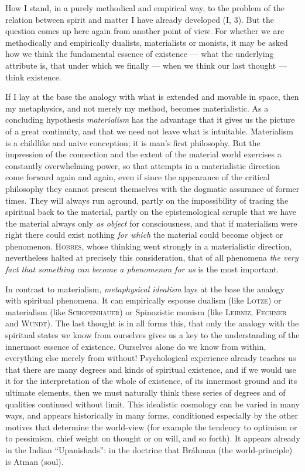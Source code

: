 \documentclass[12pt,a4paper]{book}
\newcommand{\opage}[1]{\marginnote{\footnotesize\textit{[#1]}}}
\begin{document}
How I stand, in a purely methodical and empirical way, to the problem of the
relation between spirit and matter I have already developed (I, 3). But the
question comes up here again from another point of view. For whether we are
methodically and empirically dualists, materialists or monists, it may be asked
how we think the fundamental essence of existence --- what the underlying
attribute is, that under which we finally --- when we think our last thought ---
think existence.

If I lay at the base the analogy with what is extended and movable in space, then
my metaphysics, and not merely my method, becomes materialistic. As a concluding
hypothesis \emph{materialism} has the advantage that it gives us the picture of a
great continuity, and that we need not leave what is intuitable. Materialism is a
childlike and naive conception; it is man's first philosophy. But the impression
of the connection and the extent of the material world exercises a constantly
overwhelming power, so that attempts in a materialistic direction come forward
again and again, even if since the appearance of the critical philosophy they
cannot present themselves with the dogmatic assurance of former times. They will
always run aground, partly on the impossibility of tracing the spiritual back to
the material, partly on the epistemological scruple that we have the material
always only \emph{as object} for consciousness, and that if materialism were
right there could exist nothing \emph{for which} the material could become object
or phenomenon. \textsc{Hobbes}, whose thinking went strongly in a materialistic
direction, nevertheless halted at precisely this consideration, that of all
phenomena \emph{the very fact that something can become a phenomenon for us} is
the most important.

In contrast to materialism, \emph{metaphysical idealism} lays at the base the
analogy with spiritual phenomena. It can empirically espouse dualism (like
\textsc{Lotze}) or materialism (like \textsc{Schopenhauer}) or Spinozistic monism
(like \textsc{Leibniz, Fechner} and \textsc{Wundt}). The last thought is in all
forms this, that only the analogy with the spiritual states we know from
ourselves gives us a key to the understanding of the \opage{64}innermost essence of
existence. Ourselves alone do we know from within, everything else merely from
without! Psychological experience already teaches us that there are many degrees
and kinds of spiritual existence, and if we would use it for the interpretation
of the whole of existence, of its innermost ground and its ultimate elements,
then we must naturally think these series of degrees and of qualities continued
without limit. This idealistic cosmology can be varied in many ways, and appears
historically in many forms, conditioned especially by the other motives that
determine the world-view (for example the tendency to optimism or to pessimism,
chief weight on thought or on will, and so forth). It appears already in the
Indian ``Upanishads'': in the doctrine that Bráhman (the world-principle) is
Atman (soul).
\end{document}
